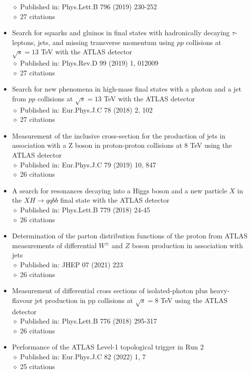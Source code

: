 \documentclass[margin, 10pt]{res} %
\begin{document}
\begin{resume}
\begin{itemize}
$\diamond$ Published in: Phys.Lett.B 796 (2019) 230-252\\
$\diamond$ 27 citations
\item Search for squarks and gluinos in final states with hadronically decaying $\tau$-leptons, jets, and missing transverse momentum using $pp$ collisions at $\sqrt{s} = 13$ TeV with the ATLAS detector\\
$\diamond$ Published in: Phys.Rev.D 99 (2019) 1, 012009\\
$\diamond$ 27 citations
\item Search for new phenomena in high-mass final states with a photon and a jet from $pp$ collisions at $\sqrt{s} = 13$ TeV with the ATLAS detector\\
$\diamond$ Published in: Eur.Phys.J.C 78 (2018) 2, 102\\
$\diamond$ 27 citations
\item Measurement of the inclusive cross-section for the production of jets in association with a Z boson in proton-proton collisions at 8 TeV using the ATLAS detector\\
$\diamond$ Published in: Eur.Phys.J.C 79 (2019) 10, 847\\
$\diamond$ 26 citations
\item A search for resonances decaying into a Higgs boson and a new particle $X$ in the $XH \rightarrow qqbb$ final state with the ATLAS detector\\
$\diamond$ Published in: Phys.Lett.B 779 (2018) 24-45\\
$\diamond$ 26 citations
\item Determination of the parton distribution functions of the proton from ATLAS measurements of differential $W^{\pm}$ and $Z$ boson production in association with jets\\
$\diamond$ Published in: JHEP 07 (2021) 223\\
$\diamond$ 26 citations
\item Measurement of differential cross sections of isolated-photon plus heavy-flavour jet production in pp collisions at $\sqrt{s} = 8$ TeV using the ATLAS detector\\
$\diamond$ Published in: Phys.Lett.B 776 (2018) 295-317\\
$\diamond$ 26 citations
\item Performance of the ATLAS Level-1 topological trigger in Run 2\\
$\diamond$ Published in: Eur.Phys.J.C 82 (2022) 1, 7\\
$\diamond$ 25 citations

\end{itemize}
\end{resume}
\end{document}
